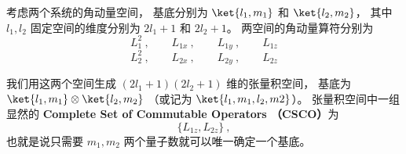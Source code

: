 
\begin{issues}
\issueAbstract
\end{issues}


考虑两个系统的角动量空间， 基底分别为 $\ket{l_1, m_1}$ 和 $\ket{l_2, m_2}$， 其中 $l_1, l_2$ 固定空间的维度分别为 $2l_1+1$ 和 $2l_2+1$。 两空间的角动量算符分别为
\begin{equation}\label{eq_AMAdd_1}
L_1^2~, \qquad L_{1x}~, \qquad L_{1y}~, \qquad L_{1z}
\end{equation}
\begin{equation}\label{eq_AMAdd_7}
L_2^2~, \qquad L_{2x}~, \qquad L_{2y}~, \qquad L_{2z}
\end{equation}

我们用这两个空间生成 $(2l_1+1)(2l_2+1)$ 维的张量积空间， 基底为 $\ket{l_1, m_1}\otimes\ket{l_2, m_2}$ （或记为 $\ket{l_1, m_1, l_2, m2}$）。 张量积空间中一组显然的 \textbf{Complete Set of Commutable Operators （CSCO）}为 %
\begin{equation}
\{L_{1z}, L_{2z}\}~,
\end{equation}
也就是说只需要 $m_1, m_2$ 两个量子数就可以唯一确定一个基底。


